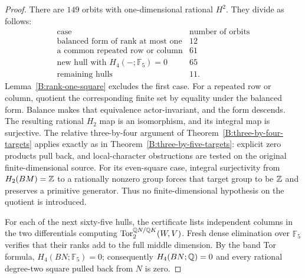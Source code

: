 \begin{proof}
There are $149$ orbits with one-dimensional rational $H^2$.
They divide as follows:
\[
\begin{array}{l|r}
\text{case}&\text{number of orbits}\\\hline
\text{balanced form of rank at most one}&12\\
\text{a common repeated row or column}&61\\
\text{new hull with }H_4(-;\mathbb F_5)=0&65\\
\text{remaining hulls}&11.
\end{array}
\]
Lemma~\ref{B:rank-one-square} excludes the first case.
For a repeated row or column, quotient the corresponding finite set
by equality under the balanced form.  Balance makes that equivalence
actor-invariant, and the form descends.  The resulting rational
$H_2$ map is an isomorphism, and its integral map is surjective.
The relative three-by-four argument of
Theorem~\ref{B:three-by-four-targets} applies exactly as in
Theorem~\ref{B:three-by-five-targets}: explicit zero products pull
back, and local-character obstructions are tested on the original
finite-dimensional source.  For its even-square case, integral
surjectivity from $H_2(BM)=\mathbb Z$ to a rationally nonzero group forces
that target group to be $\mathbb Z$ and preserves a primitive generator.
Thus no finite-dimensional hypothesis on the quotient is introduced.

For each of the next sixty-five hulls, the certificate lists
independent columns in the two differentials computing
$\operatorname{Tor}_2^{\mathbb Q N/\mathbb Q K}(W,V)$.
Fresh dense elimination over $\mathbb F_5$ verifies that their
ranks add to the full middle dimension.  By the band Tor formula,
$H_4(BN;\mathbb F_5)=0$; consequently $H_4(BN;\mathbb Q)=0$ and
every rational degree-two square pulled back from $N$ is zero.


\end{proof}

